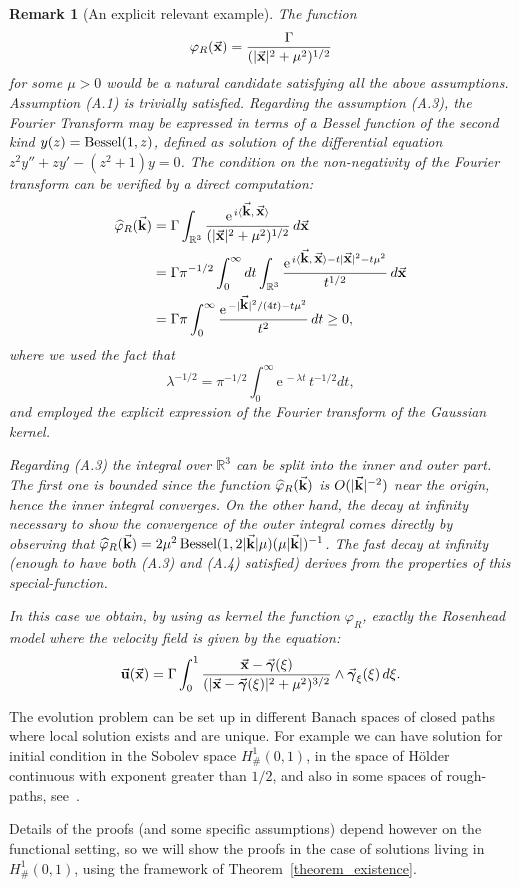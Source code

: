 \documentclass[a4paper,11pt]{article}
\numberwithin{equation}{section}
\newtheorem{remark}{Remark}
\newcommand{\R}{\mathbb{R}}
\newcommand{\la}{\langle}
\newcommand{\ra}{\rangle}
\newcommand{\U}{\mbox{$\vec{\bf u}$}}
\newcommand{\bgamma}{\mbox{$\vec{\boldsymbol \gamma}$}}
\renewcommand{\k}{\mbox{$\vec{\bf k}$}}
\newcommand{\x}{\mbox{$\vec{\bf x}$}}
\begin{document}
\begin{remark}[An explicit relevant example]
The function 
$$
\varphi_R(\x) = \frac{\Gamma}{(|\x|^2+\mu^2)^{1/2}}
$$ 
for some $\mu > 0$ would be a natural candidate satisfying all the
above assumptions. Assumption (A.1) is trivially satisfied. Regarding
the assumption (A.3), the Fourier Transform may be expressed in terms
of a Bessel function of the second kind $y(z)=\mbox{\rm Bessel}(1,z)$,
defined as solution of the differential equation
$z^2y''+zy'-(z^2+1)y=0$. The condition on the non-negativity of
the Fourier transform can be verified by a direct computation: 
\begin{equation*}
  \begin{aligned}
\widehat{\varphi}_R(\k) & = \Gamma \int_{\R^3} \frac{\mbox{\rm e}^{\,i\la
    \k,\,\x\ra}}{(|\x|^2+\mu^2)^{1/2}}\,d\x \\ 
& = \Gamma \pi^{-1/2} \int_0^\infty dt \int_{\R^3} \frac{\mbox{\rm
    e}^{\,i\la \k,\,\x\ra - t |\x|^2 -t \mu^2}} {t^{1/2}}\,d\x \\ 
& = \Gamma \pi \int_0^\infty\frac{\mbox{\rm
    e}^{\,-|\k|^2/(4t) -t \mu^2}}{ t^{2}}\,dt \ge 0,
  \end{aligned}
\end{equation*}
where we used the fact that
$$ 
\lambda^{-1/2} = \pi^{-1/2} \int_0^\infty \text{e}^{\,-\lambda
  t}\,t^{-1/2} dt,
$$
and employed the explicit expression of the Fourier transform of the
Gaussian kernel.\par
%
Regarding (A.3) the integral over $\R^3$ can be split into the inner
and outer part. The first one is bounded since the function
$\widehat{\varphi}_R(\k)$ is $O(|\k|^{-2})$ near the origin, hence the
inner integral converges. On the other hand, the decay at infinity
necessary to show the convergence of the outer integral comes directly
by observing that $\widehat{\varphi}_R(\k)=2\mu^2\,\mbox{\rm
  Bessel}(1,2|\k|\mu) (\mu|\k|)^{-1}$. The fast decay at infinity
(enough to have both (A.3) and (A.4) satisfied) derives from the
properties of this special-function.\par     
%
In this case we obtain, by using as kernel the function $\varphi_R$,
exactly the Rosenhead model where the velocity
field is given by the equation:  
$$
\U(\x) = \Gamma \int_0^1 %
\frac{\x-\bgamma(\xi)}{(|\x-\bgamma(\xi)|^2+\mu^2)^{3/2}} \wedge
\bgamma_\xi(\xi)\,d\xi.  
$$ 
\end{remark}
The evolution problem can be set up in different Banach spaces of
closed paths where local solution exists and are unique. For example
we can have solution for initial condition in the Sobolev space
$H^1_\#(0,1)$, in the space of H\"older continuous with exponent
greater than $1/2$, and also in some spaces of rough-paths,
see~\cite{bb,BGR}.\par  
%
Details of the proofs (and some specific assumptions) depend
however on the functional setting, so we will show the proofs in the
case of solutions living in $H^1_\#(0,1)$, using the framework of
Theorem~\ref{theorem_existence}. 
%
\end{document}
